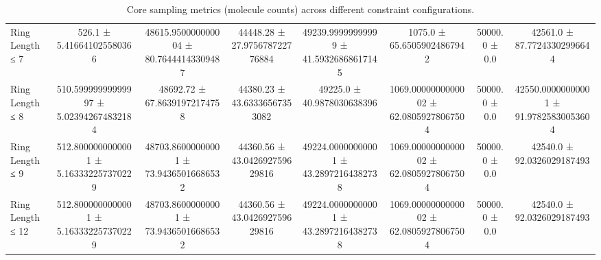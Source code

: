 \begin{table}[H]
\begin{tabular}{l c c c c c c c}
        Ring Length ≤ 7 & 526.1 ± 5.416641025580366 & 48615.950000000004 ± 80.76444143309487 & 44448.28 ± 27.975678722776884 & 49239.99999999999 ± 41.59326868617145 & 1075.0 ± 65.65059024867942 & 50000.0 ± 0.0 & 42561.0 ± 87.77243302996644 \\
        Ring Length ≤ 8 & 510.59999999999997 ± 5.023942674832184 & 48692.72 ± 67.86391972174758 & 44380.23 ± 43.63336567353082 & 49225.0 ± 40.9878030638396 & 1069.0000000000002 ± 62.08059278067504 & 50000.0 ± 0.0 & 42550.00000000001 ± 91.97825830053604 \\
        Ring Length ≤ 9 & 512.8000000000001 ± 5.163332257370229 & 48703.86000000001 ± 73.94365016686532 & 44360.56 ± 43.042692759629816 & 49224.00000000001 ± 43.28972164382738 & 1069.0000000000002 ± 62.08059278067504 & 50000.0 ± 0.0 & 42540.0 ± 92.0326029187493 \\
        Ring Length ≤ 12 & 512.8000000000001 ± 5.163332257370229 & 48703.86000000001 ± 73.94365016686532 & 44360.56 ± 43.042692759629816 & 49224.00000000001 ± 43.28972164382738 & 1069.0000000000002 ± 62.08059278067504 & 50000.0 ± 0.0 & 42540.0 ± 92.0326029187493 \\
        \bottomrule
    \end{tabular}
    \caption{Core sampling metrics (molecule counts) across different constraint configurations.}
\end{table}